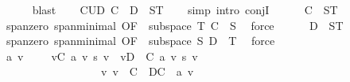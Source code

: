 \begin{isabellebody}
\ \ \ \ \isamarkupfalse%
\ blast\isanewline
\ \ \isamarkupfalse%
\ CUD{\isacharcolon}{\kern0pt}\ {\isachardoublequoteopen}C\ {\isasymunion}\ D\ {\isasymsubseteq}\ {\isacharquery}{\kern0pt}ST{\isachardoublequoteclose}\isanewline
\ \ \isamarkupfalse%
\ {\isacharparenleft}{\kern0pt}simp{\isacharcomma}{\kern0pt}\ intro\ conjI{\isacharparenright}{\kern0pt}\isanewline
\ \ \ \ \isamarkupfalse%
\ {\isachardoublequoteopen}C\ {\isasymsubseteq}\ {\isacharquery}{\kern0pt}ST{\isachardoublequoteclose}\isanewline
\ \ \ \ \ \ \isamarkupfalse%
\ span{\isacharunderscore}{\kern0pt}zero\ span{\isacharunderscore}{\kern0pt}minimal\ {\isacharbrackleft}{\kern0pt}OF\ {\isacharunderscore}{\kern0pt}\ {\isacartoucheopen}subspace\ T{\isacartoucheclose}{\isacharbrackright}{\kern0pt}\ {\isacartoucheopen}C\ {\isasymsubseteq}\ S{\isacartoucheclose}\ \isamarkupfalse%
\ force\isanewline
\ \ \ \ \isamarkupfalse%
\ {\isachardoublequoteopen}D\ {\isasymsubseteq}\ {\isacharquery}{\kern0pt}ST{\isachardoublequoteclose}\isanewline
\ \ \ \ \ \ \isamarkupfalse%
\ span{\isacharunderscore}{\kern0pt}zero\ span{\isacharunderscore}{\kern0pt}minimal\ {\isacharbrackleft}{\kern0pt}OF\ {\isacharunderscore}{\kern0pt}\ {\isacartoucheopen}subspace\ S{\isacartoucheclose}{\isacharbrackright}{\kern0pt}\ {\isacartoucheopen}D\ {\isasymsubseteq}\ T{\isacartoucheclose}\ \isamarkupfalse%
\ force\isanewline
\ \ \isamarkupfalse%
\isanewline
\ \ \isamarkupfalse%
\ {\isachardoublequoteopen}a\ v\ {\isacharequal}{\kern0pt}\ {}{\isachardoublequoteclose}\ \ {}{\isacharcolon}{\kern0pt}\ {\isachardoublequoteopen}{\isacharparenleft}{\kern0pt}{\isasymSum}v{\isasymin}C{\isachardot}{\kern0pt}\ a\ v\ {\isacharasterisk}{\kern0pt}s\ v{\isacharparenright}{\kern0pt}\ {\isacharplus}{\kern0pt}\ {\isacharparenleft}{\kern0pt}{\isasymSum}v{\isasymin}D\ {\isacharminus}{\kern0pt}\ C{\isachardot}{\kern0pt}\ a\ v\ {\isacharasterisk}{\kern0pt}s\ v{\isacharparenright}{\kern0pt}\ {\isacharequal}{\kern0pt}\ {}{\isachardoublequoteclose}\isanewline
\ \ \ \ \ \ \ \ \ \ \ \ \ \ \ \ \ \ v{\isacharcolon}{\kern0pt}\ {\isachardoublequoteopen}v\ {\isasymin}\ C\ {\isasymunion}\ {\isacharparenleft}{\kern0pt}D{\isacharminus}{\kern0pt}C{\isacharparenright}{\kern0pt}{\isachardoublequoteclose}\ \ a\ v\isanewline
\ \ \isamarkupfalse%
\ {\isacharminus}{\kern0pt}\isanewline
\ \ \ \ \isamarkupfalse%

\end{isabellebody}
